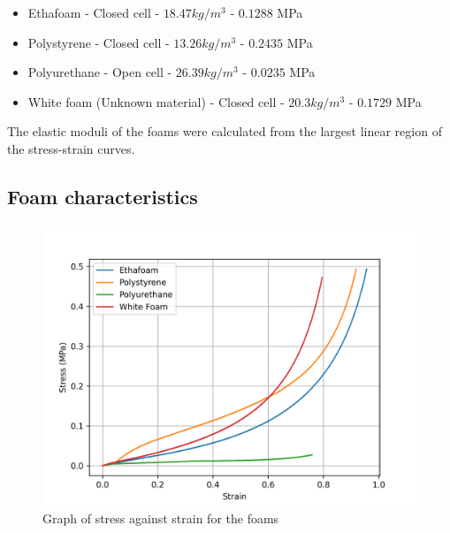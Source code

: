 \documentclass{article}
\begin{document}
\begin{itemize}
    \item Ethafoam - Closed cell - $ 18.47 kg/m^3 $ - $0.1288$ MPa
    \item Polystyrene - Closed cell - $ 13.26 kg/m^3 $ - $0.2435$ MPa
    \item Polyurethane - Open cell - $ 26.39 kg/m^3 $ - $0.0235$ MPa
    \item White foam (Unknown material) - Closed cell - $20.3 kg/m^3 $ - $0.1729$ MPa
\end{itemize}
The elastic moduli of the foams were calculated from the largest linear region of the stress-strain curves.

\subsection{Foam characteristics}

\begin{figure}[H]
\centering
\includegraphics[width=1\textwidth]{stress_vs_strain.png}
\caption{\label{fig:stress_vs_strain} Graph of stress against strain for the foams}
\end{figure}
\end{document}
